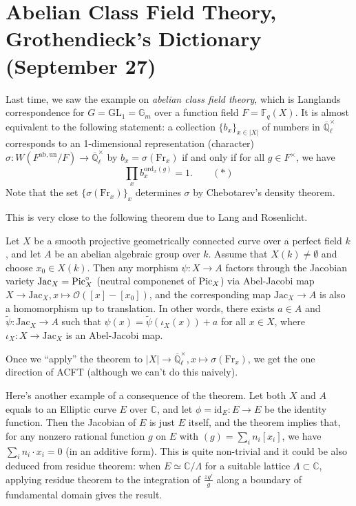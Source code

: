 \newpage
\section{Abelian Class Field Theory, Grothendieck's Dictionary (September 27)}

Last time, we saw the example on \emph{abelian class field theory},
which is Langlands correspondence for $G = \mathrm{GL}_1 = \mathbb{G}_m$ over a 
function field $F = \mathbb{F}_q(X)$.
It is almost equivalent to the following statement:
a collection $\{b_{x}\}_{x\in |X|}$ of numbers in $\overline{\mathbb{Q}}_{\ell}^{\times}$
corresponds to an 1-dimensional representation (character) $\sigma: W(F^{\mathrm{ab,un}}/F) \to \overline{\mathbb{Q}}_{\ell}^{\times}$
by $b_{x} = \sigma(\mathrm{Fr}_{x})$ if and only if for all $g \in F^{\times}$, we have
$$
\prod_{x} b_{x}^{\mathrm{ord}_{x}(g)} = 1.\qquad (*)
$$
Note that the set $\{\sigma(\mathrm{Fr}_{x})\}_{x}$ determines $\sigma$ by Chebotarev's density theorem.

This is very close to the following theorem due to Lang and Rosenlicht.
\begin{theorem}
    Let $X$ be a smooth projective geometrically connected curve over a perfect field $k$, and let $A$ be an 
    abelian algebraic group over $k$. Assume that $X(k)\neq\emptyset$ and choose $x_{0} \in X(k)$.
    Then any morphism $\psi: X \to A$ factors through the Jacobian variety $\mathrm{Jac}_X = \operatorname{\mathrm{Pic}}_{X}^{\circ}$
    (neutral componenet of $\operatorname{\mathrm{Pic}}_X$) via Abel-Jacobi map $X\to \mathrm{Jac}_X, x \mapsto \mathcal{O}([x]-[x_0])$,
    and the corresponding map $\mathrm{Jac}_X \to A$ is also a homomorphism up to translation.
    In other words, there exists $a \in A$ and $\tilde{\psi}: \mathrm{Jac}_{X} \to A$ such that $\psi(x) = \tilde{\psi}(\iota_X(x)) + a$
    for all $x\in X$, where $\iota_X: X\to \mathrm{Jac}_X$ is an Abel-Jacobi map.
\end{theorem}
Once we ``apply'' the theorem to $|X|\to \overline{\mathbb{Q}}_{\ell}^{\times}, x\mapsto \sigma(\mathrm{Fr}_{x})$, we get the one direction of ACFT (although we can't do this naively).

Here's another example of a consequence of the theorem.
Let both $X$ and $A$ equals to an Elliptic curve $E$ over $\mathbb{C}$, and let $\phi= \mathrm{id}_E:E \to E$ be the identity function.
Then the Jacobian of $E$ is just $E$ itself, and the theorem implies that, for any nonzero rational function $g$ on $E$ with $(g) = \sum_{i}n_{i}[x_i]$,
we have $\sum_i n_i \cdot x_i = 0$ (in an additive form).
This is quite non-trivial and it could be also deduced from residue theorem:
when $E \simeq \mathbb{C}/\Lambda$ for a suitable lattice $\Lambda \subset \mathbb{C}$, applying residue theorem to
the integration of $\frac{zg'}{g}$ along a boundary of fundamental domain gives the result.

